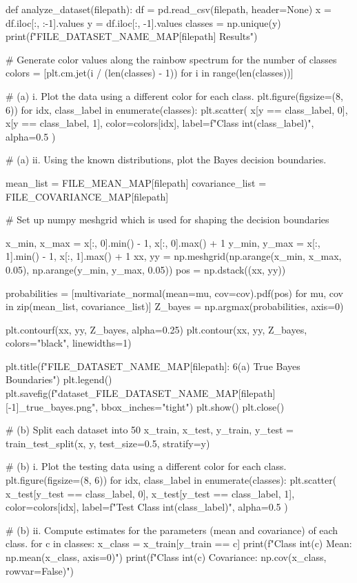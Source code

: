 \documentclass{article}
\begin{document}
{\begin{spverbatim}
def analyze_dataset(filepath):
  df = pd.read_csv(filepath, header=None)
  x = df.iloc[:, :-1].values
  y = df.iloc[:, -1].values
  classes = np.unique(y)
  print(f"{FILE_DATASET_NAME_MAP[filepath]} Results")
  
  # Generate color values along the rainbow spectrum for the number of classes
  colors = [plt.cm.jet(i / (len(classes) - 1)) for i in range(len(classes))]

  # (a) i. Plot the data using a different color for each class.
  plt.figure(figsize=(8, 6))
  for idx, class_label in enumerate(classes):
    plt.scatter(
      x[y == class_label, 0],
      x[y == class_label, 1],
      color=colors[idx], label=f"Class {int(class_label)}", alpha=0.5
    )

  # (a) ii. Using the known distributions, plot the Bayes decision boundaries.

  mean_list = FILE_MEAN_MAP[filepath]
  covariance_list = FILE_COVARIANCE_MAP[filepath]

  # Set up numpy meshgrid which is used for shaping the decision boundaries

  x_min, x_max = x[:, 0].min() - 1, x[:, 0].max() + 1
  y_min, y_max = x[:, 1].min() - 1, x[:, 1].max() + 1
  xx, yy = np.meshgrid(np.arange(x_min, x_max, 0.05), np.arange(y_min, y_max, 0.05))
  pos = np.dstack((xx, yy))

  probabilities = [multivariate_normal(mean=mu, cov=cov).pdf(pos) for mu, cov in zip(mean_list, covariance_list)]
  Z_bayes = np.argmax(probabilities, axis=0)

  plt.contourf(xx, yy, Z_bayes, alpha=0.25)
  plt.contour(xx, yy, Z_bayes, colors="black", linewidths=1)
    
  plt.title(f"{FILE_DATASET_NAME_MAP[filepath]}: 6(a) True Bayes Boundaries")
  plt.legend()
  plt.savefig(f"dataset_{FILE_DATASET_NAME_MAP[filepath][-1]}_true_bayes.png", bbox_inches="tight")
  plt.show()
  plt.close()

  # (b) Split each dataset into 50%
  x_train, x_test, y_train, y_test = train_test_split(x, y, test_size=0.5, stratify=y)

  # (b) i. Plot the testing data using a different color for each class.
  plt.figure(figsize=(8, 6))
  for idx, class_label in enumerate(classes):
    plt.scatter(
      x_test[y_test == class_label, 0],
      x_test[y_test == class_label, 1],
      color=colors[idx], label=f"Test Class {int(class_label)}", alpha=0.5
    )

  # (b) ii. Compute estimates for the parameters (mean and covariance) of each class.
  for c in classes:
    x_class = x_train[y_train == c]
    print(f"Class {int(c)} Mean: {np.mean(x_class, axis=0)}")
    print(f"Class {int(c)} Covariance: {np.cov(x_class, rowvar=False)}")


\end{spverbatim}}
\end{document}
